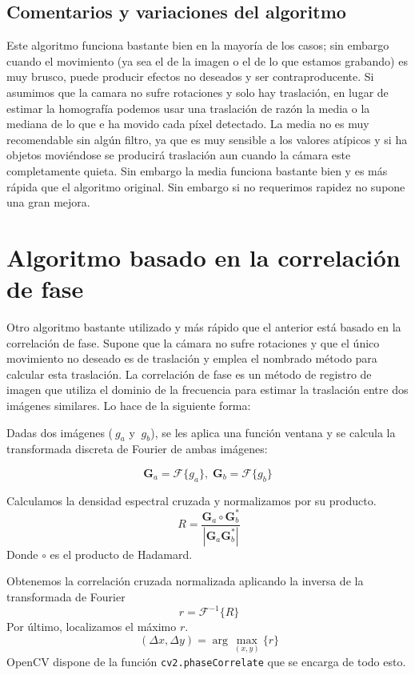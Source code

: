 \documentclass[a4paper,openright, 12pt]{book}
\begin{document}
\subsection{Comentarios y variaciones del algoritmo}
Este algoritmo funciona bastante bien en la mayoría de los casos; sin embargo cuando el movimiento (ya sea el de la imagen o el de lo que estamos grabando) es muy brusco, puede producir efectos no deseados y ser contraproducente. Si asumimos que la camara no sufre rotaciones y solo hay traslación, en lugar de estimar la homografía podemos usar una traslación de razón la media o la mediana de lo que e ha movido cada píxel detectado. La media no es muy recomendable sin algún filtro, ya que es muy sensible a los valores atípicos y si ha objetos moviéndose se producirá traslación aun cuando la cámara este completamente quieta. Sin embargo la media funciona bastante bien y es más rápida que el algoritmo original. Sin embargo si no requerimos rapidez no supone una gran mejora.
\newpage
\section{Algoritmo basado en la correlación de fase}
Otro algoritmo bastante utilizado y más rápido que el anterior está basado en la correlación de fase. Supone que la cámara no sufre rotaciones y que el único movimiento no deseado es de traslación y emplea el nombrado método para calcular esta traslación.
\newline
La correlación de fase es un método de registro de imagen que utiliza el dominio de la frecuencia para estimar la traslación entre dos imágenes similares. Lo hace de la siguiente forma:


Dadas dos imágenes ($\ g_a$ y $\ g_b$), se les aplica una función ventana y se calcula la transformada discreta de Fourier de ambas imágenes:
  
\begin{equation*} 
    \mathbf{G}_a = \mathcal{F}\{g_a\}, \; \mathbf{G}_b = \mathcal{F}\{g_b\}
\end{equation*}

Calculamos la densidad espectral cruzada y normalizamos por su producto.
\begin{equation*}
   \ R = \frac{ \mathbf{G}_a \circ \mathbf{G}_b^*}{|\mathbf{G}_a \mathbf{G}_b^*|}
\end{equation*}
Donde $\circ$ es el producto de Hadamard.

Obtenemos la correlación cruzada normalizada aplicando la inversa de la transformada de Fourier
\begin{equation*}
    \ r = \mathcal{F}^{-1}\{R\}
\end{equation*}
Por último, localizamos el máximo  $r$.
\begin{equation*}
    \ (\Delta x, \Delta y) = \arg \max_{(x, y)}\{r\} 
\end{equation*}
OpenCV dispone de la función \lstinline|cv2.phaseCorrelate| que se encarga de todo esto.
\newpage
\end{document}
